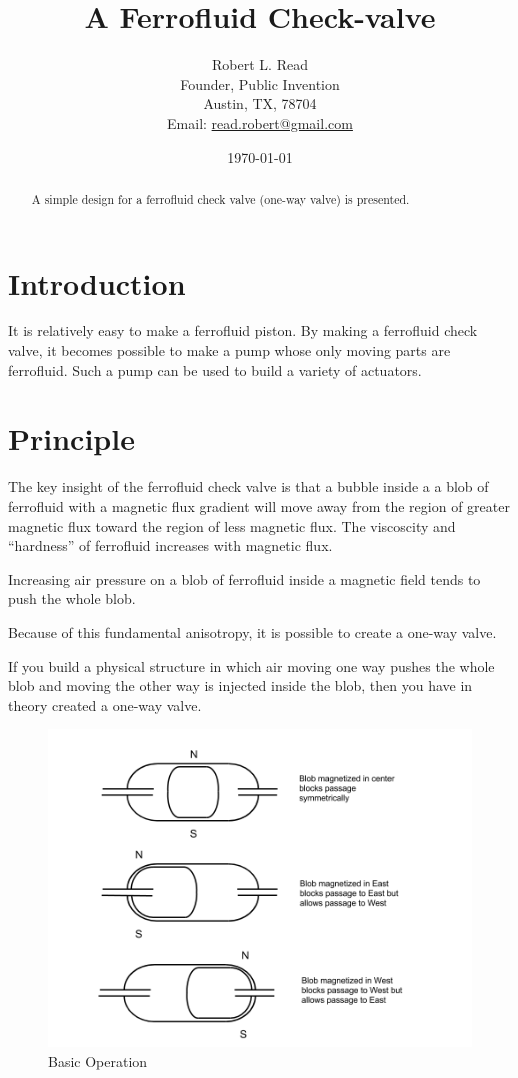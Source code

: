 \documentclass{article}
\title{A Ferrofluid Check-valve}
\author{Robert L. Read \\
    Founder, Public Invention \\
    Austin, TX, 78704 \\
    Email: \href{mailto:read.robert@gmail.com}{read.robert@gmail.com} 
}
\date{\today}
\begin{document}
\maketitle

\begin{abstract}
  A simple design for a ferrofluid check valve (one-way valve) is
  presented.
\end{abstract}


\section{Introduction}

It is relatively easy to make a ferrofluid piston. By making
a ferrofluid check valve, it becomes possible to make a pump
whose only moving parts are ferrofluid.  Such a pump can
be used to build a variety of actuators.

\section{Principle}

The key insight of the ferrofluid check valve is that a bubble inside a
a blob of ferrofluid with a magnetic flux gradient will move away from
the region of greater magnetic flux toward the region of less magnetic
flux. The viscoscity and ``hardness'' of ferrofluid increases
with magnetic flux.

Increasing air pressure on a blob of ferrofluid inside a magnetic
field tends to push the whole blob.

Because of this fundamental anisotropy, it is possible to
create a one-way valve.

If you build a physical structure in which air moving one way
pushes the whole blob and moving the other way is injected inside
the blob, then you have in theory created a one-way valve.

\begin{figure}
  \centering
     \includegraphics[width=1.0\textwidth]{BasicOperation.png}
     \caption{Basic Operation}
  \label{fig:closeup}     
\end{figure}
\end{document}
